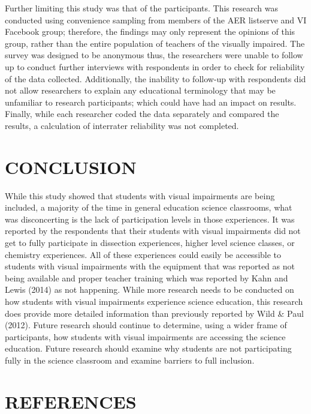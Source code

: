 \documentclass[11.5pt]{sig-alternate} %
\begin{document}
\begin{large}
Further limiting this study was that of the participants.  This research was conducted using convenience sampling from members of the AER listserve and VI Facebook group; therefore, the findings may only represent the opinions of this group, rather than the entire population of teachers of the visually impaired. The survey was designed to be anonymous thus, the researchers were unable to follow up to conduct further interviews with respondents in order to check for reliability of the data collected.  Additionally, the inability to follow-up with respondents did not allow researchers to explain any educational terminology that may be unfamiliar to research participants; which could have had an impact on results.  Finally, while each researcher coded the data separately and compared the results, a calculation of interrater reliability was not completed.  

\section*{CONCLUSION}

While this study showed that students with visual impairments are being included, a majority of the time in general education science classrooms, what was disconcerting is the lack of participation levels in those experiences.  It was reported by the respondents that their students with visual impairments did not get to fully participate in dissection experiences, higher level science classes, or chemistry experiences.  All of these experiences could easily be accessible to students with visual impairments with the equipment that was reported as not being available and proper teacher training which was reported by Kahn and Lewis (2014) as not happening.  
While more research needs to be conducted on how students with visual impairments experience science education, this research does provide more detailed information than previously reported by Wild \& Paul (2012).  Future research should continue to determine, using a wider frame of participants, how students with visual impairments are accessing the science education.  Future research should examine why students are not participating fully in the science classroom and examine barriers to full inclusion.  

\end{large}
\clearpage
\section*{REFERENCES}\par 
\end{document}
